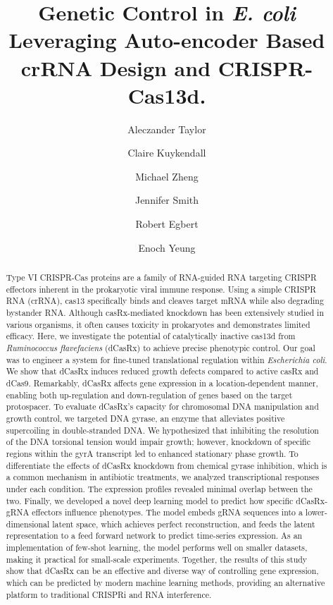 \documentclass[times]{zHenriquesLab-StyleBioRxiv}
\title{Genetic Control in \textit{E. coli} Leveraging Auto-encoder Based crRNA Design and CRISPR-Cas13d.}
\author[1\Letter]{Aleczander Taylor}
\author[3]{Claire Kuykendall}
\author[2,3]{Michael Zheng}
\author[1]{Jennifer Smith}
\author[4]{Robert Egbert}
\author[1]{Enoch Yeung}
\affil[1]{University of California Santa Barbara, Department of Mechanical Engineering}
\affil[2]{University of California Santa Barbara, Department of Statistics and Applied Probability}
\affil[3]{University of California Santa Barbara, Department of Molecular, Cellular, and Developmental Biology}
\affil[4]{Pacific Northwest National Laboratory}
\begin{document}
\maketitle

\begin{abstract} 
Type VI CRISPR-Cas proteins are a family of RNA-guided RNA targeting CRISPR effectors inherent in the prokaryotic viral immune response. Using a simple CRISPR RNA (crRNA), cas13 specifically binds and cleaves target mRNA while also degrading bystander RNA. Although casRx-mediated knockdown has been extensively studied in various organisms, it often causes toxicity in prokaryotes and demonstrates limited efficacy. Here, we investigate the potential of catalytically inactive cas13d from \textit{Ruminococcus flavefaciens} (dCasRx) to achieve precise phenotypic control.  Our goal was to engineer a system for fine-tuned translational regulation within \textit{Escherichia coli}. We show that dCasRx induces reduced growth defects compared to active casRx and dCas9. Remarkably, dCasRx affects gene expression in a location-dependent manner, enabling both up-regulation and down-regulation of genes based on the target protospacer. To evaluate dCasRx's capacity for chromosomal DNA manipulation and growth control, we targeted DNA gyrase, an enzyme that alleviates positive supercoiling in double-stranded DNA. We hypothesized that inhibiting the resolution of the DNA torsional tension would impair growth; however, knockdown of specific regions within the gyrA transcript led to enhanced stationary phase growth. To differentiate the effects of dCasRx knockdown from chemical gyrase inhibition, which is a common mechanism in antibiotic treatments, we analyzed transcriptional responses under each condition. The expression profiles revealed minimal overlap between the two. Finally, we developed a novel deep learning model to predict how specific dCasRx-gRNA effectors influence phenotypes. The model embeds gRNA sequences into a lower-dimensional latent space, which achieves perfect reconstruction, and feeds the latent representation to a feed forward network to predict time-series expression. As an implementation of few-shot learning, the model performs well on smaller datasets, making it practical for small-scale experiments. Together, the results of this study show that dCasRx can be an effective and diverse way of controlling gene expression, which can be predicted by modern machine learning methods, providing an alternative platform to traditional CRISPRi and RNA interference.
\end{abstract}
\end{document}
